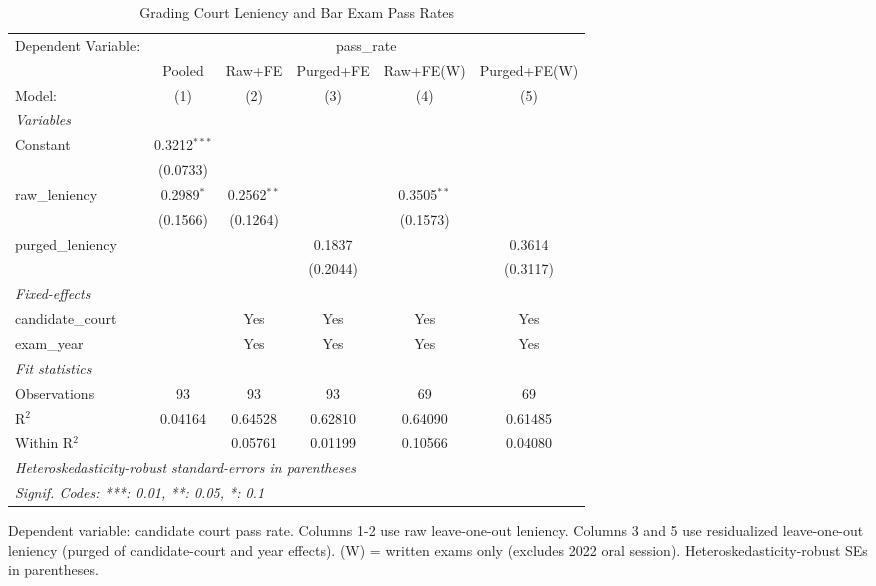 
\begin{table}[htbp]
   \caption{\label{tab:main} Grading Court Leniency and Bar Exam Pass Rates}
   \centering
   \begin{tabular}{lccccc}
      \tabularnewline \midrule \midrule
      Dependent Variable: & \multicolumn{5}{c}{pass\_rate}\\
                        & Pooled         & Raw+FE        & Purged+FE & Raw+FE(W)     & Purged+FE(W) \\   
      Model:            & (1)            & (2)           & (3)       & (4)           & (5)\\  
      \midrule
      \emph{Variables}\\
      Constant          & 0.3212$^{***}$ &               &           &               &   \\   
                        & (0.0733)       &               &           &               &   \\   
      raw\_leniency     & 0.2989$^{*}$   & 0.2562$^{**}$ &           & 0.3505$^{**}$ &   \\   
                        & (0.1566)       & (0.1264)      &           & (0.1573)      &   \\   
      purged\_leniency  &                &               & 0.1837    &               & 0.3614\\   
                        &                &               & (0.2044)  &               & (0.3117)\\   
      \midrule
      \emph{Fixed-effects}\\
      candidate\_court  &                & Yes           & Yes       & Yes           & Yes\\  
      exam\_year        &                & Yes           & Yes       & Yes           & Yes\\  
      \midrule
      \emph{Fit statistics}\\
      Observations      & 93             & 93            & 93        & 69            & 69\\  
      R$^2$             & 0.04164        & 0.64528       & 0.62810   & 0.64090       & 0.61485\\  
      Within R$^2$      &                & 0.05761       & 0.01199   & 0.10566       & 0.04080\\  
      \midrule \midrule
      \multicolumn{6}{l}{\emph{Heteroskedasticity-robust standard-errors in parentheses}}\\
      \multicolumn{6}{l}{\emph{Signif. Codes: ***: 0.01, **: 0.05, *: 0.1}}\\
   \end{tabular}
   
   \par \raggedright 
   Dependent variable: candidate court pass rate. Columns 1-2 use raw leave-one-out leniency. Columns 3 and 5 use residualized leave-one-out leniency (purged of candidate-court and year effects). (W) = written exams only (excludes 2022 oral session). Heteroskedasticity-robust SEs in parentheses.
\end{table}


